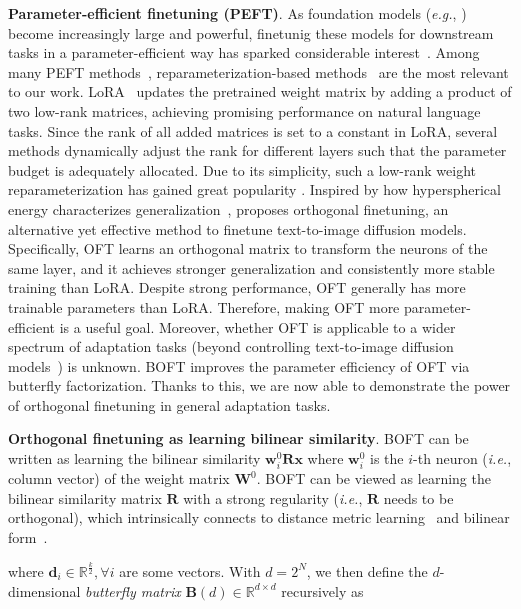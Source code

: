 \textbf{Parameter-efficient finetuning (PEFT)}. As foundation models (\emph{e.g.}, \cite{brown2020language,radford2021learning,rombach2022high,kirillov2023segment})  become increasingly large and powerful, finetunig these models for downstream tasks in a parameter-efficient way has sparked considerable interest~\cite{treviso2023efficient,ding2023parameter,lialin2023scaling}. Among many PEFT methods~\cite{houlsby2019parameter,aghajanyan2020intrinsic,hulora2022,edalati2022krona,wang2022adamix,gheini2021cross,zaken2022bitfit,guo2020parameter,sung2021training,ansell2022composable,lester2021power,li2021prefix,vu2022spot,he2021towards,mao2021unipelt,karimi2021compacter,liu2022few,sung2022lst,chen2022parameter,jia2022visual,chen2022adaptformer,zhang2022neural,jie2023fact,lian2022scaling,luo2023towards}, reparameterization-based methods~\cite{aghajanyan2020intrinsic,hulora2022,edalati2022krona} are the most relevant to our work. LoRA~\cite{hulora2022} updates the pretrained weight matrix by adding a product of two low-rank matrices, achieving promising performance on natural language tasks. Since the rank of all added matrices is set to a constant in LoRA, several methods \cite{zhang2022adaptive,valipour2022dylora,zhang2023increlora} dynamically adjust the rank for different layers such that the parameter budget is adequately allocated. Due to its simplicity, such a low-rank weight reparameterization has gained great popularity \cite{dettmers2023qlora,zi2023delta,chavan2023one}. Inspired by how hyperspherical energy characterizes generalization~\cite{liu2018learning,liu2021orthogonal}, \cite{qiu2023controlling} proposes orthogonal finetuning, an alternative yet effective method to finetune text-to-image diffusion models. Specifically, OFT learns an orthogonal matrix to transform the neurons of the same layer, and it achieves stronger generalization and consistently more stable training than LoRA. Despite strong performance, OFT generally has more trainable parameters than LoRA. Therefore, making OFT more parameter-efficient is a useful goal. Moreover, whether OFT is applicable to a wider spectrum of adaptation tasks (beyond controlling text-to-image diffusion models~\cite{qiu2023controlling}) is unknown. BOFT improves the parameter efficiency of OFT via butterfly factorization. Thanks to this, we are now able to demonstrate the power of orthogonal finetuning in general adaptation tasks.

\textbf{Orthogonal finetuning as learning bilinear similarity}. BOFT can be written as learning the bilinear similarity $\bm{w}^0_i\bm{R}\bm{x}$ where $\bm{w}^0_i$ is the $i$-th neuron (\emph{i.e.}, column vector) of the weight matrix $\bm{W}^0$. BOFT can be viewed as learning the bilinear similarity matrix $\bm{R}$ with a strong regularity (\emph{i.e.}, $\bm{R}$ needs to be orthogonal), which intrinsically connects to distance metric learning~\cite{xing2002distance} and bilinear form~\cite{roman2005advanced}.

where $\bm{d}_i\in\mathbb{R}^{\frac{k}{2}},\forall i$ are some vectors. With $d=2^N$, we then define the $d$-dimensional \emph{butterfly matrix} $\bm{B}(d)\in\mathbb{R}^{d\times d}$ recursively as